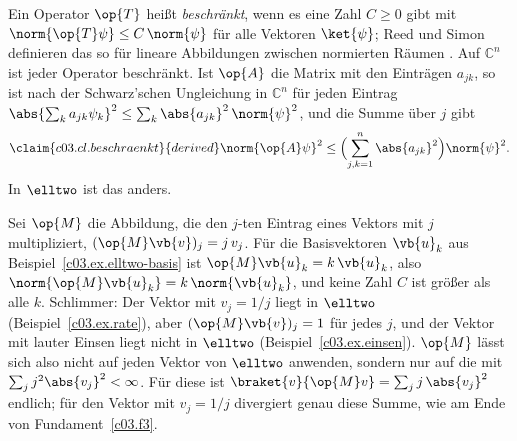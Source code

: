 \begin{vertiefung}[id=c03.v5,
    titel={Beschränkte und unbeschränkte Operatoren},
    wozu={Im Kern ist jeder Operator auf dem ganzen Raum definiert, und hermitesch heißt dasselbe
      wie selbstadjungiert. Hier steht, warum das bei Operatoren mit eingeschränktem
      Definitionsbereich nicht mehr so ist: Wichtige Operatoren sind in unendlich vielen
      Dimensionen unbeschränkt, und ein unbeschränkter symmetrischer Operator lässt sich nicht
      auf dem ganzen Raum definieren.},
    voraussetzung={Abschnitte~\ref{c03.s8} bis~\ref{c03.s10}; Vertiefungen~\ref{c03.v1} und~\ref{c03.v4}
      (Beispiel einer Basis von $\elltwo$). Der Kern bis Kapitel~4 braucht den Block nicht;
      Kapitel~5 nimmt das Thema mit den Definitionsbereichen wieder auf.},
    zurueck={In endlicher Dimension ist jeder Operator beschränkt und auf dem ganzen Raum
      definiert, und hermitesch und selbstadjungiert sind dasselbe. In unendlich vielen
      Dimensionen gehört zu einem Operator sein Definitionsbereich, und erst mit ihm lässt sich
      sagen, ob ein symmetrischer Operator selbstadjungiert ist.}]
  Ein Operator $\op{T}$ heißt \emph{beschränkt}, wenn es eine Zahl $C \geq 0$ gibt mit
  $\norm{\op{T}\psi} \leq C\, \norm{\psi}$ für alle Vektoren $\ket{\psi}$; Reed und Simon
  definieren das so für lineare Abbildungen zwischen normierten Räumen
  . Auf $\mathbb{C}^n$ ist jeder Operator beschränkt. Ist $\op{A}$
  die Matrix mit den Einträgen $a_{jk}$, so ist nach der Schwarz'schen Ungleichung in
  $\mathbb{C}^n$ für jeden Eintrag
  $\abs{\sum_k a_{jk} \psi_k}^2 \leq \sum_k \abs{a_{jk}}^2\, \norm{\psi}^2$, und die Summe über
  $j$ gibt
  \begin{equation}\label{c03.eq.beschraenkt}\claim{c03.cl.beschraenkt}{derived}
    \norm{\op{A}\psi}^2 \leq \Bigl( \sum_{j,k=1}^{n} \abs{a_{jk}}^2 \Bigr) \norm{\psi}^2 .
  \end{equation}
  In $\elltwo$ ist das anders.

  \begin{example}\label{c03.ex.unbeschraenkt}
    Sei $\op{M}$ die Abbildung, die den $j$-ten Eintrag eines Vektors mit $j$ multipliziert,
    $(\op{M}\vb{v})_j = j\, v_j$. Für die Basisvektoren $\vb{u}_k$ aus
    Beispiel~\ref{c03.ex.elltwo-basis} ist $\op{M}\vb{u}_k = k\, \vb{u}_k$, also
    $\norm{\op{M}\vb{u}_k} = k\, \norm{\vb{u}_k}$, und keine Zahl $C$ ist größer als alle $k$.
    Schlimmer: Der Vektor mit $v_j = 1/j$ liegt in $\elltwo$ (Beispiel~\ref{c03.ex.rate}), aber
    $(\op{M}\vb{v})_j = 1$ für jedes $j$, und der Vektor mit lauter Einsen liegt nicht in
    $\elltwo$ (Beispiel~\ref{c03.ex.einsen}). $\op{M}$ lässt sich also nicht auf jeden Vektor
    von $\elltwo$ anwenden, sondern nur auf die mit $\sum_j j^2 \abs{v_j}^2 < \infty$. Für diese
    ist $\braket{v}{\op{M}v} = \sum_j j\, \abs{v_j}^2$ endlich; für den Vektor mit $v_j = 1/j$
    divergiert genau diese Summe, wie am Ende von Fundament~\ref{c03.f3}.
  \end{example}


\end{vertiefung}

